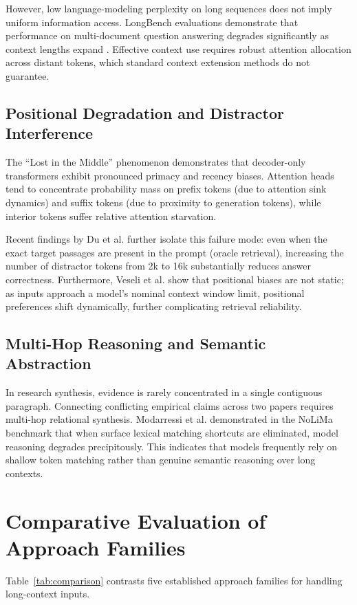 \documentclass[manuscript,screen,oneside]{acmart}
\begin{document}
However, low language-modeling perplexity on long sequences does not imply uniform information access. LongBench evaluations demonstrate that performance on multi-document question answering degrades significantly as context lengths expand \cite{bai2024longbench}. Effective context use requires robust attention allocation across distant tokens, which standard context extension methods do not guarantee.

\subsection{Positional Degradation and Distractor Interference}
The ``Lost in the Middle'' phenomenon \cite{liu2024lost} demonstrates that decoder-only transformers exhibit pronounced primacy and recency biases. Attention heads tend to concentrate probability mass on prefix tokens (due to attention sink dynamics) and suffix tokens (due to proximity to generation tokens), while interior tokens suffer relative attention starvation.

Recent findings by Du et al. \cite{du2025contextlength} further isolate this failure mode: even when the exact target passages are present in the prompt (oracle retrieval), increasing the number of distractor tokens from 2k to 16k substantially reduces answer correctness. Furthermore, Veseli et al. \cite{veseli2025positional} show that positional biases are not static; as inputs approach a model's nominal context window limit, positional preferences shift dynamically, further complicating retrieval reliability.

\subsection{Multi-Hop Reasoning and Semantic Abstraction}
In research synthesis, evidence is rarely concentrated in a single contiguous paragraph. Connecting conflicting empirical claims across two papers requires multi-hop relational synthesis. Modarressi et al. \cite{modarressi2025nolima} demonstrated in the NoLiMa benchmark that when surface lexical matching shortcuts are eliminated, model reasoning degrades precipitously. This indicates that models frequently rely on shallow token matching rather than genuine semantic reasoning over long contexts.

\section{Comparative Evaluation of Approach Families}\label{sec:comparison}
Table~\ref{tab:comparison} contrasts five established approach families for handling long-context inputs.
\end{document}
